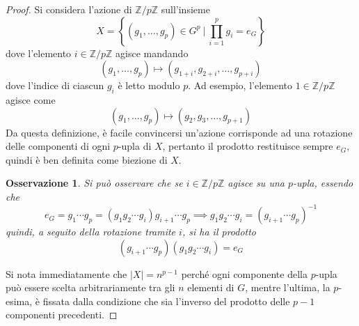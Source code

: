 \documentclass[11pt]{scrartcl}
\theoremstyle{style}
\newtheorem{osservazione}{Osservazione}[section]
\numberwithin{equation}{subsection}
\begin{document}
	\begin{proof}
		Si considera l'azione di $\mathbb{Z} / p\mathbb{Z}$ sull'insieme
		\[
		X = \left\{ (g_1,\ldots,g_p) \in G^p  \ \bigg  \lvert \ \prod_{i=1} ^p g_i = e_G\right\} 
		\] 
		dove l'elemento $i \in \mathbb{Z}/ p\mathbb{Z}$ agisce mandando
		\[
			(g_1,\ldots,g_p)\longmapsto (g_{1+i},g_{2+i}  ,\ldots,g_{p+i} )
		\] 
		dove l'indice di ciascun $g_i$ \`e letto modulo $p$. Ad esempio, l'elemento $1 \in \mathbb{Z}/p\mathbb{Z}$ agisce come 
		\[
			(g_1,\ldots,g_p)\longmapsto (g_{2},g_{3}  ,\ldots,g_{p+1} )
		\] 
		Da questa definizione, \`e facile convincersi un'azione corrisponde ad una rotazione delle componenti di ogni $p$-upla di $X$, pertanto il prodotto restituisce sempre $e_G$, quindi \`e ben definita come biezione di $X$.
		\begin{osservazione}
		Si pu\`o osservare che se $i \in \mathbb{Z} /p \mathbb{Z}$ agisce su una $p$-upla, essendo che 
		\[
		e_G= g_1 \cdots g_p=(g_1 g_2 \cdots g_i) g_{i+1} \cdots g_p \implies g_1 g_2 \cdots g_i = (g_{i+1} \cdots g_p)^{-1}
		\] 
		quindi, a seguito della rotazione tramite $i$, si ha il prodotto
		\[
			(g_{i+1} \cdots g_p) (g_1 g_2 \cdots g_i)= e_G
		\] 
		\end{osservazione}
		Si nota immediatamente che $\lvert X \rvert = n^{p-1} $ perch\'e ogni componente della $p$-upla pu\`o essere scelta arbitrariamente tra gli $n$ elementi di $G$, mentre l'ultima, la $p$-esima, \`e fissata dalla condizione che sia l'inverso del prodotto delle $p-1$ componenti precedenti.
		

\end{proof}
\end{document}
